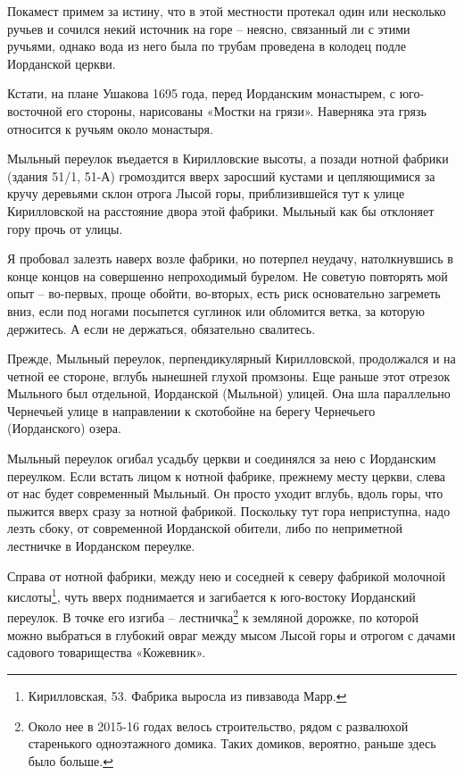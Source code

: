 Покамест примем за истину, что в этой местности протекал один или несколько ручьев и сочился некий источник на горе – неясно, связанный ли с этими ручьями, однако вода из него была по трубам проведена в колодец подле Иорданской церкви.

Кстати, на плане Ушакова 1695 года, перед Иорданским монастырем, с юго-восточной его стороны, нарисованы «Мостки на грязи». Наверняка эта грязь относится к ручьям около монастыря.

Мыльный переулок въедается в Кирилловские высоты, а позади нотной фабрики (здания 51/1, 51-А) громоздится вверх заросший кустами и цепляющимися за кручу деревьями склон отрога Лысой горы, приблизившейся тут к улице Кирилловской на расстояние двора этой фабрики. Мыльный как бы отклоняет гору прочь от улицы. 

Я пробовал залезть наверх возле фабрики, но потерпел неудачу, натолкнувшись в конце концов на совершенно непроходимый бурелом. Не советую повторять мой опыт – во-первых, проще обойти, во-вторых, есть риск основательно загреметь вниз, если под ногами посыпется суглинок или обломится ветка, за которую держитесь. А если не держаться, обязательно свалитесь.

Прежде, Мыльный переулок, перпенди\-кулярный Ки\-рилловской, продолжался и на четной ее стороне, вглубь нынешней глухой промзоны. Еще раньше этот отрезок Мыльного был отдельной, Иорданской (Мыльной) улицей. Она шла параллельно Чернечьей улице в направлении к скотобойне на берегу Чернечьего (Иорданского) озера.

Мыльный переулок огибал усадьбу церкви и  соединялся за нею с Иорданским переулком. Если встать лицом к нотной фабрике, прежнему месту церкви, слева от нас будет современный Мыльный. Он просто уходит вглубь, вдоль горы, что пыжится вверх сразу за нотной фабрикой. Поскольку тут гора неприступна, надо лезть сбоку, от современной Иорданской обители, либо по неприметной лестничке в Иорданском переулке.

Справа от нотной фабрики, между нею и соседней к северу фабрикой молочной кислоты\footnote{Кирилловская, 53. Фабрика выросла из пивзавода Марр.}, чуть вверх поднимается и загибается к юго-востоку Иорданский переулок. В точке его изгиба – лестничка\footnote{Около нее в 2015-16 годах велось строительство, рядом с развалюхой старенького одноэтажного домика. Таких домиков, вероятно, раньше здесь было больше.} к земляной дорожке, по которой можно выбраться в глубокий овраг между мысом Лысой горы и отрогом с дачами садового товарищества «Кожевник». 

